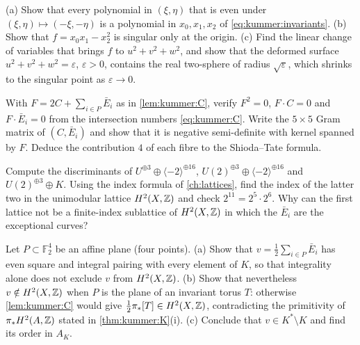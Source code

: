 \begin{exercise}\label{exr:kummer:cone}
(a) Show that every polynomial in $(\xi,\eta)$ that is even under
$(\xi,\eta)\mapsto(-\xi,-\eta)$ is a polynomial in $x_0,x_1,x_2$ of
\eqref{eq:kummer:invariants}. (b) Show that $f=x_0x_1-x_2^2$ is singular only at the origin.
(c) Find the linear change of variables that brings $f$ to $u^2+v^2+w^2$, and show that the
deformed surface $u^2+v^2+w^2=\varepsilon$, $\varepsilon>0$, contains the real two-sphere of
radius $\sqrt\varepsilon$, which shrinks to the singular point as $\varepsilon\to0$.
\end{exercise}

\begin{exercise}\label{exr:kummer:I0}
With $F=2C+\sum_{i\in P}\bar E_i$ as in \cref{lem:kummer:C}, verify $F^2=0$,
$F\cdot C=0$ and $F\cdot\bar E_i=0$ from the intersection numbers \eqref{eq:kummer:C}. Write
the $5\times5$ Gram matrix of $(C,\bar E_i)$ and show that it is negative semi-definite
with kernel spanned by $F$. Deduce the contribution $4$ of each fibre to the Shioda--Tate
formula.
\end{exercise}

\begin{exercise}\label{exr:kummer:disc}
Compute the discriminants of $U^{\oplus3}\oplus\langle-2\rangle^{\oplus16}$,
$U(2)^{\oplus3}\oplus\langle-2\rangle^{\oplus16}$ and $U(2)^{\oplus3}\oplus K$. Using the
index formula of \cref{ch:lattices}, find the index of the latter two in the unimodular lattice
$H^2(X,\mathbb{Z})$ and check $2^{11}=2^5\cdot2^6$. Why can the first lattice not be a finite-index
sublattice of $H^2(X,\mathbb{Z})$ in which the $\bar E_i$ are the exceptional curves?
\end{exercise}

\begin{exercise}\label{exr:kummer:planes}
Let $P\subset\mathbb{F}_2^4$ be an affine plane (four points). (a) Show that
$v=\frac12\sum_{i\in P}\bar E_i$ has even square and integral pairing with every element of
$K$, so that integrality alone does not exclude $v$ from $H^2(X,\mathbb{Z})$. (b) Show that
nevertheless $v\notin H^2(X,\mathbb{Z})$ when $P$ is the plane of an invariant torus $T$: otherwise
\cref{lem:kummer:C} would give $\frac12\pi_*[T]\in H^2(X,\mathbb{Z})$, contradicting the primitivity
of $\pi_*H^2(A,\mathbb{Z})$ stated in \cref{thm:kummer:K}(i). (c) Conclude that $v\in K^*\setminus K$
and find its order in $A_K$.
\end{exercise}

